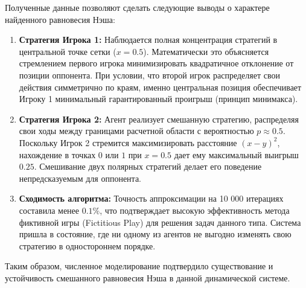 Полученные данные позволяют сделать следующие выводы о характере найденного равновесия Нэша:

\begin{enumerate}
    \item \textbf{Стратегия Игрока 1:} Наблюдается полная концентрация стратегий в центральной точке сетки ($x = 0.5$). Математически это объясняется стремлением первого игрока минимизировать квадратичное отклонение от позиции оппонента. При условии, что второй игрок распределяет свои действия симметрично по краям, именно центральная позиция обеспечивает Игроку 1 минимальный гарантированный проигрыш (принцип минимакса).
    
    \item \textbf{Стратегия Игрока 2:} Агент реализует смешанную стратегию, распределяя свои ходы между границами расчетной области с вероятностью $p \approx 0.5$. Поскольку Игрок 2 стремится максимизировать расстояние $(x - y)^2$, нахождение в точках $0$ или $1$ при $x=0.5$ дает ему максимальный выигрыш $0.25$. Смешивание двух полярных стратегий делает его поведение непредсказуемым для оппонента.
    
    \item \textbf{Сходимость алгоритма:} Точность аппроксимации на 10 000 итерациях составила менее $0.1\%$, что подтверждает высокую эффективность метода фиктивной игры (Fictitious Play) для решения задач данного типа. Система пришла в состояние, где ни одному из агентов не выгодно изменять свою стратегию в одностороннем порядке.
\end{enumerate}

Таким образом, численное моделирование подтвердило существование и устойчивость смешанного равновесия Нэша в данной динамической системе.



